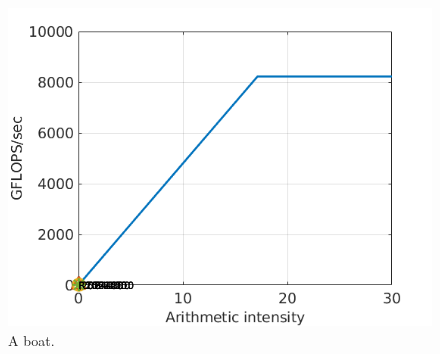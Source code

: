 \documentclass{amsart} %
\begin{document}
\begin{figure}
	\includegraphics[width=\linewidth]{roofline.png}
	\caption{A boat.}
	\label{fig:roofline model}
	\end{figure}

 

\end{document}
